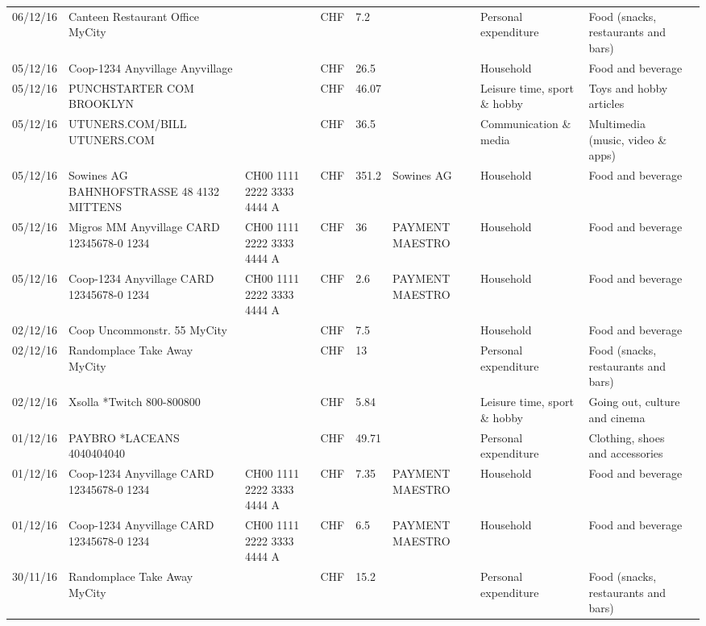 \begin{landscape}
\begin{tiny}
\begin{longtable}{lp{4cm}llllp{3cm}ll}
		    06/12/16 & Canteen Restaurant Office      MyCity &       & CHF   & 7.2   &       & Personal expenditure & Food (snacks, restaurants and bars) \\
		    05/12/16 & Coop-1234 Anyvillage    Anyvillage &       & CHF   & 26.5  &       & Household & Food and beverage \\
		    05/12/16 & PUNCHSTARTER COM          BROOKLYN &       & CHF   & 46.07 &       & Leisure time, sport \& hobby & Toys and hobby articles \\
		    05/12/16 & UTUNERS.COM/BILL          UTUNERS.COM &       & CHF   & 36.5  &       & Communication \& media & Multimedia (music, video \& apps) \\
		    05/12/16 & Sowines AG BAHNHOFSTRASSE 48 4132 MITTENS & CH00 1111 2222 3333 4444 A & CHF   & 351.2 & Sowines AG & Household & Food and beverage \\
		    05/12/16 & Migros MM Anyvillage CARD 12345678-0 1234 & CH00 1111 2222 3333 4444 A & CHF   & 36    & PAYMENT MAESTRO & Household & Food and beverage \\
		    05/12/16 & Coop-1234 Anyvillage CARD 12345678-0 1234 & CH00 1111 2222 3333 4444 A & CHF   & 2.6   & PAYMENT MAESTRO & Household & Food and beverage \\
		    02/12/16 & Coop Uncommonstr. 55   MyCity &       & CHF   & 7.5   &       & Household & Food and beverage \\
		    02/12/16 & Randomplace Take Away     MyCity &       & CHF   & 13    &       & Personal expenditure & Food (snacks, restaurants and bars) \\
		    02/12/16 & Xsolla *Twitch           800-800800 &       & CHF   & 5.84  &       & Leisure time, sport \& hobby & Going out, culture and cinema \\
		    01/12/16 & PAYBRO *LACEANS      4040404040 &       & CHF   & 49.71 &       & Personal expenditure & Clothing, shoes and accessories \\
		    01/12/16 & Coop-1234 Anyvillage CARD 12345678-0 1234 & CH00 1111 2222 3333 4444 A & CHF   & 7.35  & PAYMENT MAESTRO & Household & Food and beverage \\
		    01/12/16 & Coop-1234 Anyvillage CARD 12345678-0 1234 & CH00 1111 2222 3333 4444 A & CHF   & 6.5   & PAYMENT MAESTRO & Household & Food and beverage \\
		    30/11/16 & Randomplace Take Away     MyCity &       & CHF   & 15.2  &       & Personal expenditure & Food (snacks, restaurants and bars) \\

\end{longtable}
\end{tiny}
\end{landscape}
